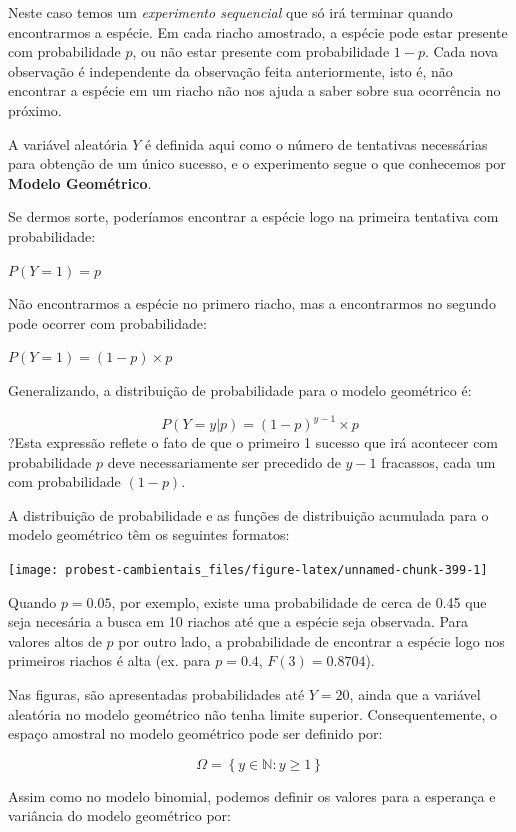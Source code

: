 \documentclass[
]{book}
\begin{document}
Neste caso temos um \emph{experimento sequencial} que só irá terminar quando encontrarmos a espécie. Em cada riacho amostrado, a espécie pode estar presente com probabilidade \(p\), ou não estar presente com probabilidade \(1-p\). Cada nova observação é independente da observação feita anteriormente, isto é, não encontrar a espécie em um riacho não nos ajuda a saber sobre sua ocorrência no próximo.

A variável aleatória \(Y\) é definida aqui como o número de tentativas necessárias para obtenção de um único sucesso, e o experimento segue o que conhecemos por \textbf{Modelo Geométrico}.

Se dermos sorte, poderíamos encontrar a espécie logo na primeira tentativa com probabilidade:

\(P(Y = 1) = p\)

Não encontrarmos a espécie no primero riacho, mas a encontrarmos no segundo pode ocorrer com probabilidade:

\(P(Y = 1) = (1-p) \times p\)

Generalizando, a distribuição de probabilidade para o modelo geométrico é:

\[P(Y = y|p) = (1-p)^{y-1} \times p\]
?Esta expressão reflete o fato de que o primeiro 1 sucesso que irá acontecer com probabilidade \(p\) deve necessariamente ser precedido de \(y-1\) fracassos, cada um com probabilidade \((1-p)\).

A distribuição de probabilidade e as funções de distribuição acumulada para o modelo geométrico têm os seguintes formatos:

\begin{center}\texttt{[image: probest-cambientais\_files/figure-latex/unnamed-chunk-399-1]} \end{center}

Quando \(p = 0.05\), por exemplo, existe uma probabilidade de cerca de 0.45 que seja necesária a busca em 10 riachos até que a espécie seja observada. Para valores altos de \(p\) por outro lado, a probabilidade de encontrar a espécie logo nos primeiros riachos é alta (ex. para \(p = 0.4\), \(F(3) = 0.8704\)).

Nas figuras, são apresentadas probabilidades até \(Y = 20\), ainda que a variável aleatória no modelo geométrico não tenha limite superior. Consequentemente, o espaço amostral no modelo geométrico pode ser definido por:

\[\Omega = \left\{ y \in \mathbb{N}: y \ge 1 \right\}\]

Assim como no modelo binomial, podemos definir os valores para a esperança e variância do modelo geométrico por:
\end{document}
